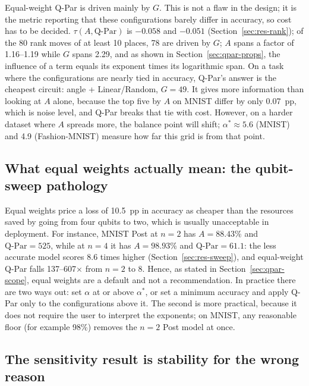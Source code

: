\documentclass{ieeeaccess}
\newcommand{\QP}{\text{Q-Par}}                %
\begin{document}
Equal-weight Q-Par is driven mainly by $G$. This is not a flaw in the design; it is the metric reporting that these configurations barely differ in accuracy, so cost has to be decided. $\tau(A, \QP)$ is $-0.058$ and $-0.051$ (Section~\ref{sec:res-rank}); of the 80 rank moves of at least 10 places, 78 are driven by $G$; $A$ spans a factor of 1.16--1.19 while $G$ spans 2.29, and as shown in Section~\ref{sec:qpar-props}, the influence of a term equals its exponent times its logarithmic span. On a task where the configurations are nearly tied in accuracy, Q-Par's answer is the cheapest circuit: angle + Linear/Random, $G = 49$. It gives more information than looking at $A$ alone, because the top five by $A$ on MNIST differ by only 0.07~pp, which is noise level, and Q-Par breaks that tie with cost. However, on a harder dataset where $A$ spreads more, the balance point will shift; $\alpha^* \approx 5.6$ (MNIST) and 4.9 (Fashion-MNIST) measure how far this grid is from that point.

\subsection{What equal weights actually mean: the qubit-sweep pathology}
\label{sec:disc-weights}

Equal weights price a loss of 10.5~pp in accuracy as cheaper than the resources saved by going from four qubits to two, which is usually unacceptable in deployment. For instance, MNIST Post at $n = 2$ has $A = 88.43$\% and $\QP = 525$, while at $n = 4$ it has $A = 98.93$\% and $\QP = 61.1$: the less accurate model scores 8.6 times higher (Section~\ref{sec:res-sweep}), and equal-weight Q-Par falls 137--607$\times$ from $n = 2$ to 8. Hence, as stated in Section~\ref{sec:qpar-scope}, equal weights are a default and not a recommendation. In practice there are two ways out: set $\alpha$ at or above $\alpha^*$, or set a minimum accuracy and apply Q-Par only to the configurations above it. The second is more practical, because it does not require the user to interpret the exponents; on MNIST, any reasonable floor (for example 98\%) removes the $n = 2$ Post model at once.

\subsection{The sensitivity result is stability for the wrong reason}
\label{sec:disc-sens}
\end{document}
